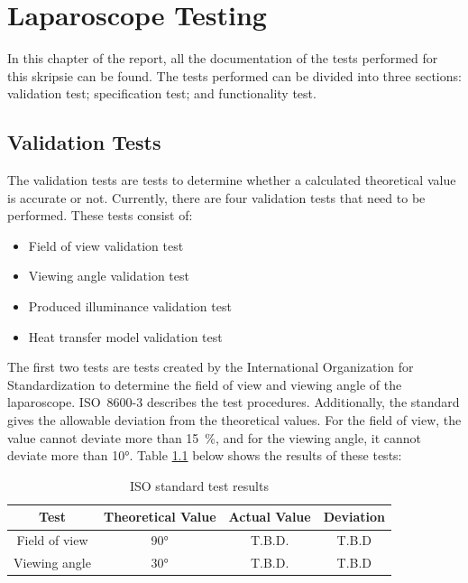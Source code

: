 \chapter{Laparoscope Testing}
\label{sec:test}


In this chapter of the report, all the documentation of the tests performed for this skripsie can be found. The tests performed can be divided into three sections: validation test; specification test; and functionality test. 

\section{Validation Tests}

The validation tests are tests to determine whether a calculated theoretical value is accurate or not. Currently, there are four validation tests that need to be performed. These tests consist of:

\begin{itemize}
    \item Field of view validation test
    \item Viewing angle validation test
    \item Produced illuminance validation test
    \item Heat transfer model validation test
\end{itemize}

The first two tests are tests created by the International Organization for Standardization to determine the field of view and viewing angle of the laparoscope. ISO~8600-3 describes the test procedures. Additionally, the standard gives the allowable deviation from the theoretical values. For the field of view, the value cannot deviate more than 15~\%, and for the viewing angle, it cannot deviate more than 10°. Table \ref{tab:ISO Tests} below shows the results of these tests:

\begin{table}[h]
    \centering
    \caption{ISO standard test results}
    \begin{tabular}{|c|c|c|c|}

    \hline
        Test & Theoretical Value & Actual Value & Deviation \\
    \hline
        Field of view & 90° & T.B.D. & T.B.D \\
    \hline
        Viewing angle & 30° & T.B.D. & T.B.D \\
    \hline

    \end{tabular}
    \label{tab:ISO Tests}
\end{table}

